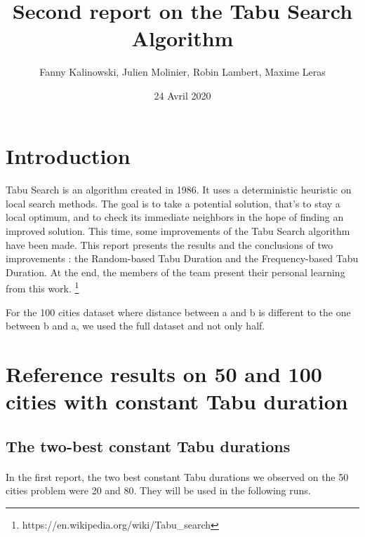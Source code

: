 \documentclass[12pt,oneside,a4paper]{article}
\begin{document}
\title{Second report on the Tabu Search Algorithm}
\author{Fanny Kalinowski, Julien Molinier, Robin Lambert, Maxime Leras}
\date{24 Avril 2020}
\maketitle\thispagestyle{empty}

\newpage    
\clearpage
\thispagestyle{empty}
\renewcommand*\contentsname{Sommaire}
\tableofcontents
\newpage

\pagestyle{fancy}
\cfoot{\thepage}
\fancyhead{}
\fancyhead[R]{\leftmark}

\section{Introduction}
\paragraph{}
    Tabu Search is an algorithm created in 1986. It uses a deterministic heuristic on
    local search methods. The goal is to take a potential solution, that's to stay a local optimum,  
    and to check its immediate neighbors in the hope of finding an improved solution.
    This time, some improvements of the Tabu Search algorithm have been made.
    This report presents the results and the conclusions of two improvements :  the Random-based Tabu Duration and the Frequency-based Tabu Duration.
    At the end, the members of the team present their personal learning from this work. 
    \footnote{https://en.wikipedia.org/wiki/Tabu\_search}

    For the 100 cities dataset where distance between a and b is different to the one between b and a,
    we used the full dataset and not only half.

\section{Reference results on 50 and 100 cities with constant Tabu duration}
\subsection{The two-best constant Tabu durations}
\paragraph{}
In the first report, the two best constant Tabu durations we observed on the 50 cities problem were 20 and 80.
They will be used in the following runs.
\end{document}
